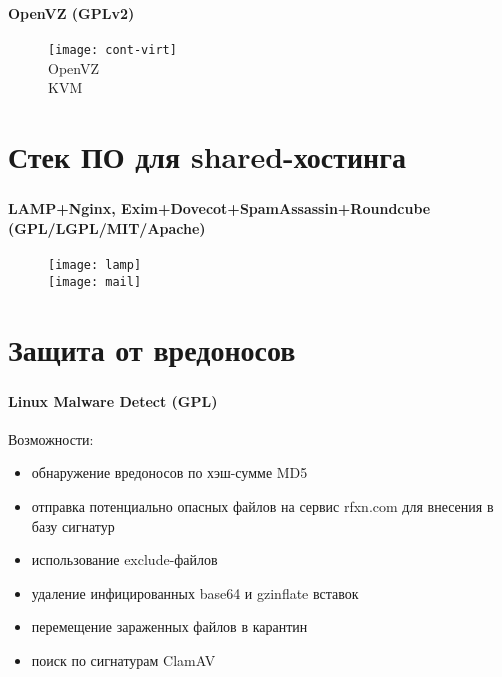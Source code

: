 \begin{frame}
\frametitle{\insertsection}
\framesubtitle{OpenVZ (GPLv2)}
\begin{figure}[h]
	\center
	\begin{multicols}{2}
		\texttt{[image: cont-virt]} \\
		OpenVZ \pause \\
		\uncover<2->{\texttt{[image: full-virt]}}
		KVM
	\end{multicols}
\end{figure}
\end{frame}


\section{Стек ПО для shared-хостинга}

\begin{frame}
\frametitle{\insertsection}
\framesubtitle{LAMP+Nginx, Exim+Dovecot+SpamAssassin+Roundcube (GPL/LGPL/MIT/Apache)}
\begin{figure}[h]
	\center
	\begin{multicols}{2}
		\texttt{[image: lamp]} \\
		\texttt{[image: mail]}
	\end{multicols}
\end{figure}
\end{frame}


\section{Защита от вредоносов}

\begin{frame}
\frametitle{\insertsection}
\framesubtitle{Linux Malware Detect (GPL)}
Возможности:
\begin{itemize}
	\item обнаружение вредоносов по хэш-сумме MD5
	\item отправка потенциально опасных файлов на сервис rfxn.com для внесения в базу сигнатур
	\item использование exclude-файлов
	\item удаление инфицированных base64 и gzinflate вставок
	\item перемещение зараженных файлов в карантин
	\item поиск по сигнатурам ClamAV
\end{itemize}
\end{frame}

